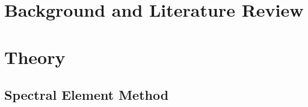 \section{Background and Literature Review}


\section{Theory}

\subsection{Spectral Element Method}


% 